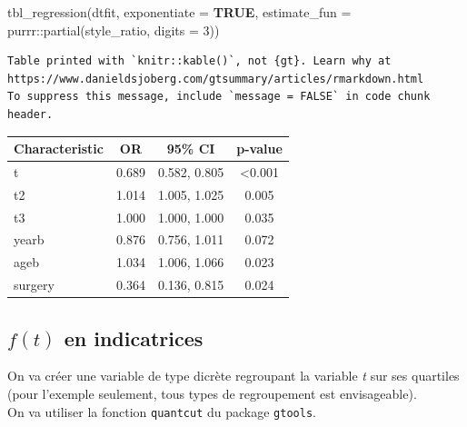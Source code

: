 \documentclass[
  12pt,
  letterpaper,
  DIV=11,
  numbers=noendperiod,
  onepage,
  openany]{scrreprt}
\newenvironment{Shaded}{\begin{snugshade}}{\end{snugshade}}
\newcommand{\AttributeTok}[1]{\textcolor[rgb]{0.80,0.80,0.80}{#1}}
\newcommand{\ConstantTok}[1]{\textcolor[rgb]{0.86,0.64,0.64}{\textbf{#1}}}
\newcommand{\DecValTok}[1]{\textcolor[rgb]{0.86,0.86,0.80}{#1}}
\newcommand{\FunctionTok}[1]{\textcolor[rgb]{0.94,0.94,0.56}{#1}}
\newcommand{\NormalTok}[1]{\textcolor[rgb]{0.80,0.80,0.80}{#1}}
\newcommand{\OtherTok}[1]{\textcolor[rgb]{0.94,0.94,0.56}{#1}}
\newcommand{\SpecialCharTok}[1]{\textcolor[rgb]{0.86,0.64,0.64}{#1}}
\begin{document}
\begin{Shaded}
\begin{Highlighting}[]
\FunctionTok{tbl\_regression}\NormalTok{(dtfit, }\AttributeTok{exponentiate =} \ConstantTok{TRUE}\NormalTok{, }\AttributeTok{estimate\_fun =}\NormalTok{ purrr}\SpecialCharTok{::}\FunctionTok{partial}\NormalTok{(style\_ratio, }\AttributeTok{digits =} \DecValTok{3}\NormalTok{))}
\end{Highlighting}
\end{Shaded}

\begin{verbatim}
Table printed with `knitr::kable()`, not {gt}. Learn why at
https://www.danieldsjoberg.com/gtsummary/articles/rmarkdown.html
To suppress this message, include `message = FALSE` in code chunk header.
\end{verbatim}

\begin{longtable}[]{@{}lccc@{}}
\toprule\noalign{}
\textbf{Characteristic} & \textbf{OR} & \textbf{95\% CI} &
\textbf{p-value} \\
\midrule\noalign{}
\endhead
\bottomrule\noalign{}
\endlastfoot
t & 0.689 & 0.582, 0.805 & \textless0.001 \\
t2 & 1.014 & 1.005, 1.025 & 0.005 \\
t3 & 1.000 & 1.000, 1.000 & 0.035 \\
yearb & 0.876 & 0.756, 1.011 & 0.072 \\
ageb & 1.034 & 1.006, 1.066 & 0.023 \\
surgery & 0.364 & 0.136, 0.815 & 0.024 \\
\end{longtable}

\hypertarget{ft-en-indicatrices}{%
\subsection{\texorpdfstring{\textbf{\(f(t)\) en indicatrices
}}{f(t) en indicatrices }}\label{ft-en-indicatrices}}

On va créer une variable de type dicrète regroupant la variable \emph{t}
sur ses quartiles (pour l'exemple seulement, tous types de regroupement
est envisageable).\\
On va utiliser la fonction \texttt{quantcut} du package \texttt{gtools}.

\begin{Shaded}
\end{Shaded}
\end{document}
